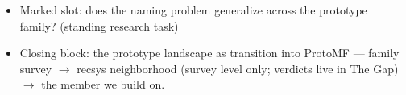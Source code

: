 \begin{itemize}
    \item [TBD] Marked slot: does the naming problem generalize across the prototype family? (standing research task)
    \item [TBD] Closing block: the prototype landscape as transition into ProtoMF — family survey $\to$ recsys neighborhood (survey level only; verdicts live in The Gap) $\to$ the member we build on. 

\end{itemize}
